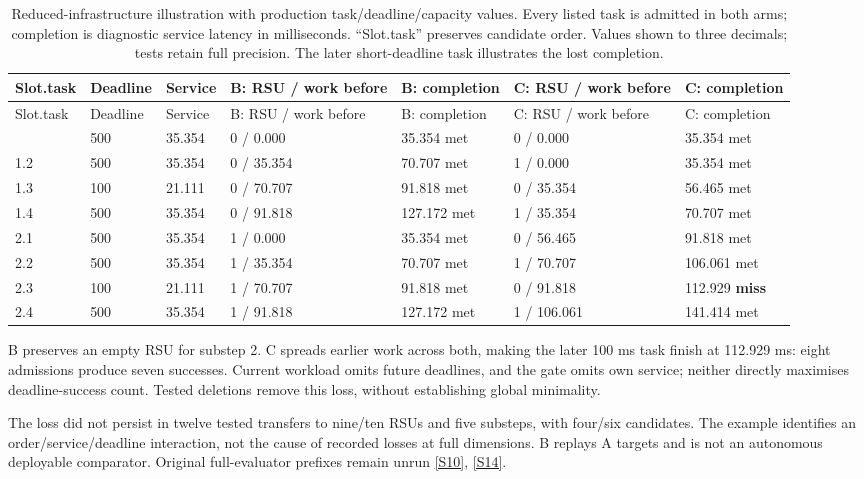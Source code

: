\documentclass[12pt,a4paper]{article}
\begin{document}
\begingroup
\singlespacing\footnotesize\setlength{\tabcolsep}{3pt}
\renewcommand{\thetable}{C1}
\begin{xltabular}{\textwidth}{@{}YYYYYYY@{}}
\caption[Adverse dispatch illustration]{Reduced-infrastructure illustration with production task/deadline/capacity values. Every listed task is admitted in both arms; completion is diagnostic service latency in milliseconds. ``Slot.task'' preserves candidate order. Values shown to three decimals; tests retain full precision. The later short-deadline task illustrates the lost completion.}\label{tab:C1} \\
\toprule
Slot.task & Deadline & Service & B: RSU / work before & B: completion & C: RSU / work before & C: completion \\
\midrule\endfirsthead
\toprule
Slot.task & Deadline & Service & B: RSU / work before & B: completion & C: RSU / work before & C: completion \\
\midrule\endhead
\bottomrule{} & 500 & 35.354 & 0 / 0.000 & 35.354 met & 0 / 0.000 & 35.354 met \\
1.2 & 500 & 35.354 & 0 / 35.354 & 70.707 met & 1 / 0.000 & 35.354 met \\
1.3 & 100 & 21.111 & 0 / 70.707 & 91.818 met & 0 / 35.354 & 56.465 met \\
1.4 & 500 & 35.354 & 0 / 91.818 & 127.172 met & 1 / 35.354 & 70.707 met \\
2.1 & 500 & 35.354 & 1 / 0.000 & 35.354 met & 0 / 56.465 & 91.818 met \\
2.2 & 500 & 35.354 & 1 / 35.354 & 70.707 met & 1 / 70.707 & 106.061 met \\
2.3 & 100 & 21.111 & 1 / 70.707 & 91.818 met & 0 / 91.818 & 112.929 \textbf{miss} \\
2.4 & 500 & 35.354 & 1 / 91.818 & 127.172 met & 1 / 106.061 & 141.414 met \\
\end{xltabular}
\endgroup

B preserves an empty RSU for substep 2. C spreads earlier work across both, making the later 100 ms task finish at 112.929 ms: eight admissions produce seven successes. Current workload omits future deadlines, and the gate omits own service; neither directly maximises deadline-success count. Tested deletions remove this loss, without establishing global minimality.

The loss did not persist in twelve tested transfers to nine/ten RSUs and five substeps, with four/six candidates. The example identifies an order/service/deadline interaction, not the cause of recorded losses at full dimensions. B replays A targets and is not an autonomous deployable comparator. Original full-evaluator prefixes remain unrun \hyperref[source-s10]{[S10]}, \hyperref[source-s14]{[S14]}.
\end{document}
